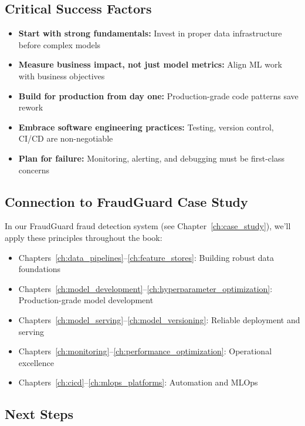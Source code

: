 \subsection*{Critical Success Factors}

\begin{itemize}
    \item \textbf{Start with strong fundamentals:} Invest in proper data infrastructure before complex models
    \item \textbf{Measure business impact, not just model metrics:} Align ML work with business objectives
    \item \textbf{Build for production from day one:} Production-grade code patterns save rework
    \item \textbf{Embrace software engineering practices:} Testing, version control, CI/CD are non-negotiable
    \item \textbf{Plan for failure:} Monitoring, alerting, and debugging must be first-class concerns
\end{itemize}

\subsection*{Connection to FraudGuard Case Study}

In our FraudGuard fraud detection system (see Chapter~\ref{ch:case_study}), we'll apply these principles throughout the book:

\begin{itemize}
    \item Chapters~\ref{ch:data_pipelines}--\ref{ch:feature_stores}: Building robust data foundations
    \item Chapters~\ref{ch:model_development}--\ref{ch:hyperparameter_optimization}: Production-grade model development
    \item Chapters~\ref{ch:model_serving}--\ref{ch:model_versioning}: Reliable deployment and serving
    \item Chapters~\ref{ch:monitoring}--\ref{ch:performance_optimization}: Operational excellence
    \item Chapters~\ref{ch:cicd}--\ref{ch:mlops_platforms}: Automation and MLOps
\end{itemize}

\subsection*{Next Steps}

